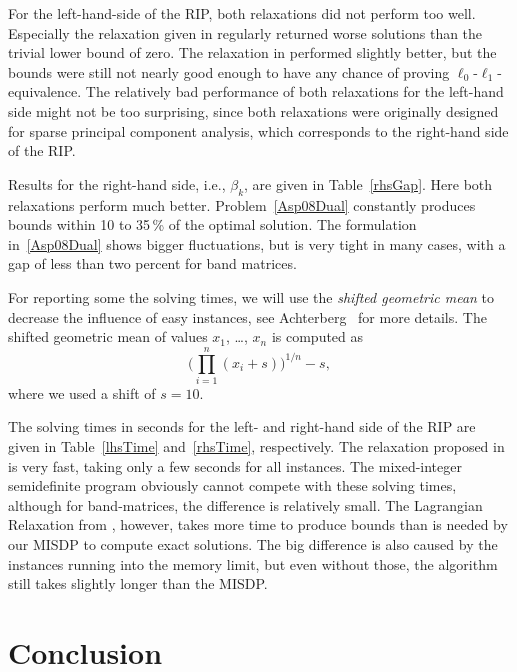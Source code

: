 \documentclass[journal]{IEEEtran}
\begin{document}
For the left-hand-side of the RIP, both relaxations did not perform
too well. Especially the relaxation given in \cite{Asp08} regularly returned worse solutions than the
trivial lower bound of zero. The relaxation in \cite{Asp07} performed slightly better, but the bounds
were still not nearly good enough to have any chance of proving $\ell_0$-$\ell_1$-equivalence. The relatively
bad performance of both relaxations for the left-hand side might not be too surprising, since both relaxations
were originally designed for sparse principal component analysis, which corresponds to the right-hand side
of the RIP.



Results for the right-hand side, i.e., $\beta_k$, are given in Table~\ref{rhsGap}. Here both relaxations
perform much better. Problem~\eqref{Asp08Dual} constantly produces bounds within 10 to 35\,\% of the optimal
solution. The formulation in~\eqref{Asp08Dual} shows bigger fluctuations, but is very tight in many cases,
with a gap of less than two percent for band matrices.



For reporting some the solving times, we will use the \emph{shifted
  geometric mean} to decrease the influence of easy instances, see
Achterberg~\cite{SCIP} for more details. The shifted geometric
mean of values $x_1$, \dots, $x_n$ is computed as
\begin{equation*}
  \Big( \prod_{i=1}^n (x_i + s)\Big)^{1/n} - s,
\end{equation*}
where we used a shift of $s=10$.

The solving times in seconds for the left- and right-hand side of the RIP are given in
Table~\ref{lhsTime} and~\ref{rhsTime}, respectively. The relaxation proposed in \cite{Asp07}
is very fast, taking only a few seconds for all instances. The mixed-integer semidefinite program obviously
cannot compete with these solving times, although for band-matrices, the difference is relatively
small. The Lagrangian Relaxation from \cite{Asp08}, however, takes more time to produce bounds than is needed
by our MISDP to compute exact solutions. The big difference is also caused by the instances running into the 
memory limit, but even without those, the algorithm still takes slightly longer than the MISDP.





\section{Conclusion}
\end{document}
